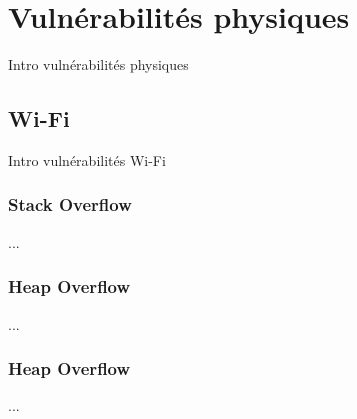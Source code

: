 

\chapter{Vulnérabilités physiques}\label{vulnerabilites:physiques}

Intro vulnérabilités physiques

\section{Wi-Fi}\label{vulnerabilites:physiques:wi-fi}

Intro vulnérabilités Wi-Fi

\subsection{Stack Overflow}\label{vulnerabilites:physiques:wi-fi:wep}

...

\subsection{Heap Overflow}\label{vulnerabilites:physiques:wi-fi:wps}

...

\subsection{Heap Overflow}\label{vulnerabilites:physiques:wi-fi:wpa}

...

\endinput

